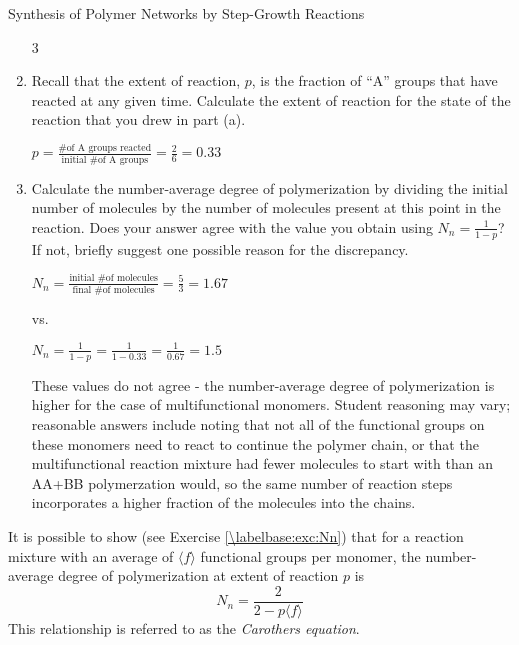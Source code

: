 \begin{activity}[extension]{Synthesis of Polymer Networks by Step-Growth Reactions}
\begin{ctqs}
\begin{enumerate}
				\begin{solution}[0.5in]{}
					3
				\end{solution}
				
			\item Recall that the extent of reaction, $p$, is the fraction of ``A'' groups that have reacted at any given time.  Calculate the extent of reaction for the state of the reaction that you drew in part (a).
			
				\begin{solution}[1.25in]{}
					$p = \frac{\text{\# of A groups reacted}}{\text{initial \# of A groups}} = \frac{2}{6} = 0.33$
				\end{solution}
				
			\item Calculate the number-average degree of polymerization by dividing the initial number of molecules by the number of molecules present at this point in the reaction.  Does your answer agree with the value you obtain using $N_n = \frac{1}{1-p}$?  If not, briefly suggest one possible reason for the discrepancy.
			
				\begin{solution}[2in]{}
					$N_n = \frac{\text{initial \# of molecules}}{\text{final \# of molecules}} = \frac{5}{3} = 1.67$
					
					vs.
					
					$N_n = \frac{1}{1-p} = \frac{1}{1-0.33} = \frac{1}{0.67} = 1.5$
					
					These values do not agree - the number-average degree of polymerization is higher for the case of multifunctional monomers.  Student reasoning may vary; reasonable answers include noting that not all of the functional groups on these monomers need to react to continue the polymer chain, or that the multifunctional reaction mixture had fewer molecules to start with than an AA+BB polymerzation would, so the same number of reaction steps incorporates a higher fraction of the molecules into the chains.
				\end{solution}
		\end{enumerate}
\end{ctqs}

\clearpage
\begin{infobox}
	It is possible to show (see Exercise \ref{\labelbase:exc:Nn}) that for a reaction mixture with an average of $\langle f\rangle$ functional groups per monomer, the number-average degree of polymerization at extent of reaction $p$ is
	\begin{equation*}
		N_n = \frac{2}{2-p\langle f \rangle} \label{\labelbase:eqn:carothers}
	\end{equation*}
	This relationship is referred to as the \emph{Carothers equation}.
\end{infobox}


\end{activity}
